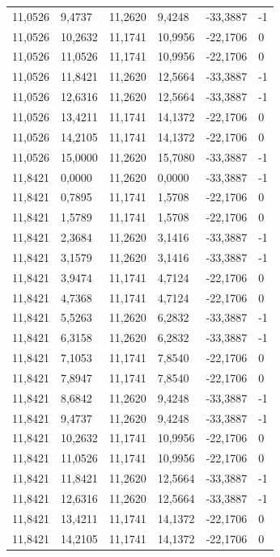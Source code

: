 \documentclass[12pt]{article}
\begin{document}
\begin{longtable}{@{}llllll@{}}
		11,0526 & 9,4737  & 11,2620 & 9,4248  & -33,3887 & -1 \\
		11,0526 & 10,2632 & 11,1741 & 10,9956 & -22,1706 & 0  \\
		11,0526 & 11,0526 & 11,1741 & 10,9956 & -22,1706 & 0  \\
		11,0526 & 11,8421 & 11,2620 & 12,5664 & -33,3887 & -1 \\
		11,0526 & 12,6316 & 11,2620 & 12,5664 & -33,3887 & -1 \\
		11,0526 & 13,4211 & 11,1741 & 14,1372 & -22,1706 & 0  \\
		11,0526 & 14,2105 & 11,1741 & 14,1372 & -22,1706 & 0  \\
		11,0526 & 15,0000 & 11,2620 & 15,7080 & -33,3887 & -1 \\
		11,8421 & 0,0000  & 11,2620 & 0,0000  & -33,3887 & -1 \\
		11,8421 & 0,7895  & 11,1741 & 1,5708  & -22,1706 & 0  \\
		11,8421 & 1,5789  & 11,1741 & 1,5708  & -22,1706 & 0  \\
		11,8421 & 2,3684  & 11,2620 & 3,1416  & -33,3887 & -1 \\
		11,8421 & 3,1579  & 11,2620 & 3,1416  & -33,3887 & -1 \\
		11,8421 & 3,9474  & 11,1741 & 4,7124  & -22,1706 & 0  \\
		11,8421 & 4,7368  & 11,1741 & 4,7124  & -22,1706 & 0  \\
		11,8421 & 5,5263  & 11,2620 & 6,2832  & -33,3887 & -1 \\
		11,8421 & 6,3158  & 11,2620 & 6,2832  & -33,3887 & -1 \\
		11,8421 & 7,1053  & 11,1741 & 7,8540  & -22,1706 & 0  \\
		11,8421 & 7,8947  & 11,1741 & 7,8540  & -22,1706 & 0  \\
		11,8421 & 8,6842  & 11,2620 & 9,4248  & -33,3887 & -1 \\
		11,8421 & 9,4737  & 11,2620 & 9,4248  & -33,3887 & -1 \\
		11,8421 & 10,2632 & 11,1741 & 10,9956 & -22,1706 & 0  \\
		11,8421 & 11,0526 & 11,1741 & 10,9956 & -22,1706 & 0  \\
		11,8421 & 11,8421 & 11,2620 & 12,5664 & -33,3887 & -1 \\
		11,8421 & 12,6316 & 11,2620 & 12,5664 & -33,3887 & -1 \\
		11,8421 & 13,4211 & 11,1741 & 14,1372 & -22,1706 & 0  \\
		11,8421 & 14,2105 & 11,1741 & 14,1372 & -22,1706 & 0  \\

\end{longtable}
\end{document}
